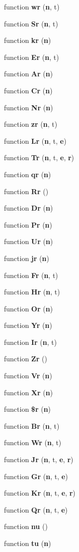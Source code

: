 \begin{DoxyCompactItemize}
\item 
function {\bf wr} ({\bf n}, t)
\item 
function {\bf Sr} ({\bf n}, t)
\item 
function {\bf kr} ({\bf n})
\item 
function {\bf Er} ({\bf n}, t)
\item 
function {\bf Ar} ({\bf n})
\item 
function {\bf Cr} ({\bf n})
\item 
function {\bf Nr} ({\bf n})
\item 
function {\bf zr} ({\bf n}, t)
\item 
function {\bf Lr} ({\bf n}, t, {\bf e})
\item 
function {\bf Tr} ({\bf n}, t, {\bf e}, {\bf r})
\item 
function {\bf qr} ({\bf n})
\item 
function {\bf Rr} ()
\item 
function {\bf Dr} ({\bf n})
\item 
function {\bf Pr} ({\bf n})
\item 
function {\bf Ur} ({\bf n})
\item 
function {\bf jr} ({\bf n})
\item 
function {\bf Fr} ({\bf n}, t)
\item 
function {\bf Hr} ({\bf n}, t)
\item 
function {\bf Or} ({\bf n})
\item 
function {\bf Yr} ({\bf n})
\item 
function {\bf Ir} ({\bf n}, t)
\item 
function {\bf Zr} ()
\item 
function {\bf Vr} ({\bf n})
\item 
function {\bf Xr} ({\bf n})
\item 
function {\bf \$r} ({\bf n})
\item 
function {\bf Br} ({\bf n}, t)
\item 
function {\bf Wr} ({\bf n}, t)
\item 
function {\bf Jr} ({\bf n}, t, {\bf e}, {\bf r})
\item 
function {\bf Gr} ({\bf n}, t, {\bf e})
\item 
function {\bf Kr} ({\bf n}, t, {\bf e}, {\bf r})
\item 
function {\bf Qr} ({\bf n}, t, {\bf e})
\item 
function {\bf nu} ()
\item 
function {\bf tu} ({\bf n})
\item 

\end{DoxyCompactItemize}
